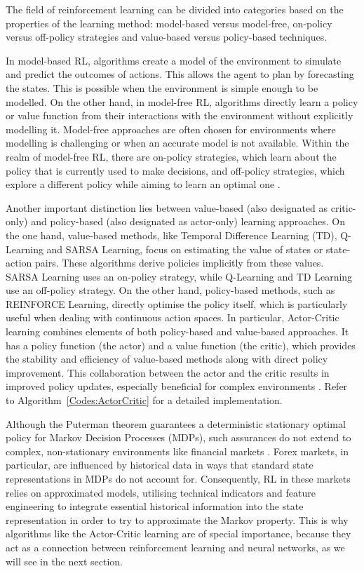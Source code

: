 The field of reinforcement learning can be divided into categories based on the properties of the learning method: model-based versus model-free, on-policy versus off-policy strategies and value-based versus policy-based techniques. 

In model-based RL, algorithms create a model of the environment to simulate and predict the outcomes of actions. This allows the agent to plan by forecasting the states. This is possible when the environment is simple enough to be modelled. On the other hand, in model-free RL, algorithms directly learn a policy or value function from their interactions with the environment without explicitly modelling it. Model-free approaches are often chosen for environments where modelling is challenging or when an accurate model is not available. Within the realm of model-free RL, there are on-policy strategies, which learn about the policy that is currently used to make decisions, and off-policy strategies, which explore a different policy while aiming to learn an optimal one \cite{sutton_reinforcement_2018}.

Another important distinction lies between value-based (also designated as critic-only) and policy-based (also designated as actor-only) learning approaches. On the one hand, value-based methods, like Temporal Difference Learning (TD), Q-Learning and SARSA Learning, focus on estimating the value of states or state-action pairs. These algorithms derive policies implicitly from these values. SARSA Learning uses an on-policy strategy, while Q-Learning and TD Learning use an off-policy strategy. On the other hand, policy-based methods, such as REINFORCE Learning, directly optimise the policy itself, which is particularly useful when dealing with continuous action spaces. In particular, Actor-Critic learning combines elements of both policy-based and value-based approaches. It has a policy function (the actor) and a value function (the critic), which provides the stability and efficiency of value-based methods along with direct policy improvement. This collaboration between the actor and the critic results in improved policy updates, especially beneficial for complex environments \cite{sutton_reinforcement_2018}. Refer to Algorithm~\ref{Codes:ActorCritic} for a detailed implementation.



Although the Puterman theorem guarantees a deterministic stationary optimal policy for Markov Decision Processes (MDPs), such assurances do not extend to complex, non-stationary environments like financial markets \cite{sutton_reinforcement_2018}. Forex markets, in particular, are influenced by historical data in ways that standard state representations in MDPs do not account for. Consequently, RL in these markets relies on approximated models, utilising technical indicators and feature engineering to integrate essential historical information into the state representation in order to try to approximate the Markov property. This is why algorithms like the Actor-Critic learning are of special importance, because they act as a connection between reinforcement learning and neural networks, as we will see in the next section.

